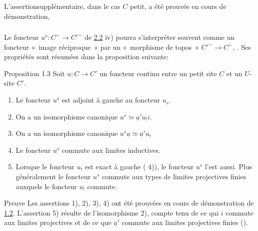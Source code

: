 L'assertion\pageoriginale supplémentaire, dans le cas $C$ petit,
a été prouvée en cours de démonstration, \cqfd

\setcounter{subsection}{2} \setcounter{subsubsection}{0}
\subsubsection{}

Le foncteur $u^s:C^{\sim}\rightarrow {C'}^{\sim}$ de
\hyperref[III.prop2.2]{2.2} iv) pourra s'interpréter souvent comme un
foncteur « image réciproque » par un « morphisme de topos » ${C'}^{\sim}\rightarrow C^{\sim}$, \cf {}. Ses
propriétés sont résumées dans la proposition
suivante:

\begin{enonce*}{Proposition 1.3}
Soit $u:C\rightarrow C'$ un foncteur continu entre un petit site $C$
et un $U$-site $C'$.
\begin{enumerate}
\renewcommand{\labelenumi}{\theenumi)}
\item Le foncteur $u^s$ est adjoint à gauche au foncteur $u_s$.

\item On a un isomorphisme canonique $u^s\simeq \underline{a}'u_{!}i$.

\item On a un isomorphisme canonique $u^s\underline{a}\simeq
  \underline{a}'u_{!}$

\item Le foncteur $u^s$ commute aux limites inductives.

\item Lorsque le foncteur $u_{!}$ est exact à gauche (\cf {} 4)),
  le foncteur $u^s$ l'est aussi. Plus généralement le foncteur
  $u^s$ commute aux types de limites projectives finies auxquels le
  foncteur $u_{!}$ commute.
\end{enumerate}
\end{enonce*}

\begin{enonce*}[remark]{Preuve}
Les assertions 1), 2), 3), 4) ont été prouvées en cours
de démonstration de \hyperref[III.prop1.2]{1.2}. L'assertion 5)
résulte de l'isomorphisme 2), compte tenu de ce qui $i$ commute
aux limites projectives et de ce que $\underline{a}'$ commute aux
limites projectives finies ().
\end{enonce*}

